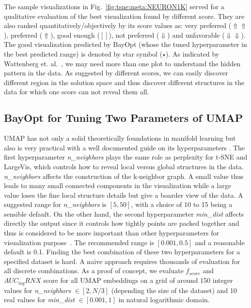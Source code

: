 The sample visualizations in Fig.~\ref{fig:tsne:meta:NEURON1K} served for a qualitative evaluation of the best visualization found by different score.
They are also ranked quantitatively/objectively by its score values as: very preferred ($\Uparrow\Uparrow$), preferred ($\Uparrow$), good enough ($[]$), not preferred ($\Downarrow$) and unfavorable ($\Downarrow\Downarrow$).
The good visualization predicted by BayOpt (whose the tuned hyperparameter in the best predicted range) is denoted by star symbol ($\star$).
As indicated by Wattenberg et. al.~\cite{wattenberg2016use}, we may need more than one plot to understand the hidden pattern in the data.
As suggested by different scores, we can easily discover different region in the solution space and thus discover different structures in the data for which one score can not reveal them all.


\subsection{BayOpt for Tuning Two Parameters of UMAP}
UMAP has not only a solid theoretically foundations in manifold learning but also is very practical with a well documented guide on its hyperparameters \cite{mcinnes2018umap-software}.
The first hyperparameter \emph{n\_neighbors} plays the same role as perplexity for t-SNE and LargeVis, which controls how to reveal local versus global structures in the data.
\emph{n\_neighbors} affects the construction of the k-neighbor graph.
A small value thus leads to many small connected components in the visualization while a large value loses the fine local structure details but give a boarder view of the data.
A suggested range for \emph{n\_neighbors} is $[5, 50]$, with a choice of 10 to 15 being a sensible default.
On the other hand, the second hyperparameter \emph{min\_dist} affects directly the output since it controls how tightly points are packed together and thus is considered to be more important than other hyperparameters for visualization purpose~\cite[Sec.4.3]{mcinnes2018umap}.
The recommended range is $[0.001, 0.5]$ and a reasonable default is 0.1.
Finding the best combination of these two hyperparameters for a specified dataset is hard.
A naive approach requires thousands of evaluation for all discrete combinations.
As a proof of concept, we evaluate $f_{score}$ and $AUC_{log}RNX$ score for all UMAP embeddings on a grid of around 150 integer values for \emph{n\_neighbors} $\in [2, N/3]$ (depending the size of the dataset) and 10 real values for \emph{min\_dist} $\in [0.001, 1]$ in natural logarithmic domain.

